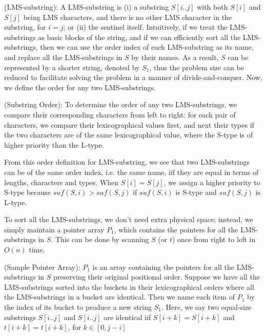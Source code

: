 \documentclass{article}
\begin{document}
 (LMS-substring): A LMS-substring is (i) a substring $S[i..j]$ with both $S[i]$ and $S[j]$ being LMS characters, and there is no other LMS character in the substring, for $i = j$; or (ii) the sentinel itself.
\newline
\newline
Intuitively, if we treat the LMS-substrings as basic blocks of the string, and if we can efficiently sort all the LMS-substrings, then we can use the order index of each LMS-substring as its name, and replace all the LMS-substrings in $S$ by their names. As a result, $S$ can be represented by a shorter string, denoted by $S_1$, thus the problem size can be reduced to facilitate solving the problem in a manner of divide-and-conquer. Now, we define the order for any two LMS-substrings.

(Substring Order): To determine the order of any two LMS-substrings, we compare their corresponding characters from left to right: for each pair of characters, we compare their lexicographical values first, and next their types if the two characters are of the same lexicographical value, where the S-type is of higher priority than the L-type.

From this order definition for LMS-substring, we see that two LMS-substrings can be of the same order index, i.e. the same name, iif they are equal in terms of lengths, characters and types. When $S[i] = S[j]$, we assign a higher priority to S-type because $suf(S, i) > suf(S, j)$ if $suf(S, i)$ is S-type and $suf(S, j)$ is L-type.

To sort all the LMS-substrings, we don’t need extra physical space; instead, we simply maintain a pointer array $P_1$, which contains the pointers for all the LMS-substrings in $S$. This can be done by scanning $S$ (or $t$) once from right to left in $O(n)$ time.

 (Sample Pointer Array): $P_1$ is an array containing the pointers for all the LMS-substrings in $S$ preserving their original positional order.
\newline
\newline
Suppose we have all the LMS-substrings sorted into the buckets in their lexicographical orders where all the LMS-substrings in a bucket are identical. Then we name each item
of $P_1$ by the index of its bucket to produce a new string $S_1$. Here, we say two equal-size substrings $S[i..j]$ and $S[i..j]$ are identical iif $S[i + k] = S[i + k]$ and $t[i + k] = t[i + k]$, for $k \in [0, j - i]$
\end{document}
